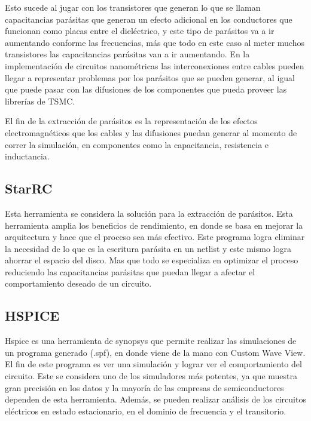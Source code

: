 Esto sucede al jugar con los transistores que generan lo que se llaman capacitancias parásitas que generan un efecto adicional en los conductores que funcionan como placas entre el dieléctrico, y este tipo de parásitos va a ir aumentando conforme las frecuencias, más que todo en este caso al meter muchos transistores las capacitancias parásitas van a ir aumentando.  En la implementación de circuitos nanométricas las interconexiones entre cables pueden llegar a representar problemas por los parásitos que se pueden generar, al igual que puede pasar con las difusiones de los componentes que pueda proveer las librerías de TSMC.

El fin de la extracción de parásitos es la representación de los efectos electromagnéticos que los cables y las difusiones puedan generar al momento de correr la simulación, en componentes como la capacitancia, resistencia e inductancia.

 \cite{charls} 

  \subsection*{StarRC}

Esta herramienta se considera la solución para la extracción de parásitos. Esta herramienta amplia los beneficios de rendimiento, en donde se basa en mejorar la arquitectura y hace que el proceso sea más efectivo. Este programa logra eliminar la necesidad de lo que es la escritura parásita en un netlist y este mismo logra ahorrar el espacio del disco. Mas que todo se especializa en optimizar el proceso reduciendo las capacitancias parásitas que puedan llegar a afectar el comportamiento deseado de un circuito.

 \cite{StarRc} 


\subsection*{HSPICE}
Hspice es una herramienta de synopsys que permite realizar las simulaciones de un programa generado (.spf), en donde viene de la mano con Custom Wave View. El fin de este programa es ver una simulación y lograr ver el comportamiento del circuito. 
Este se considera uno de los simuladores más potentes, ya que muestra gran precisión en los datos y la mayoría de las empresas de semiconductores dependen de esta herramienta.
Además, se pueden realizar análisis de los circuitos eléctricos en estado estacionario, en el dominio de frecuencia y el transitorio.



